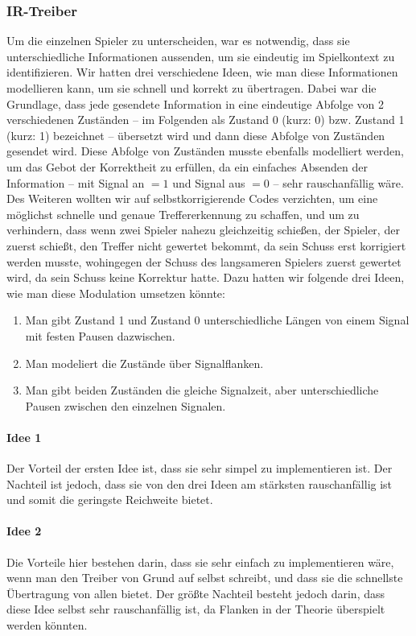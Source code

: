 \subsubsection{IR-Treiber}

Um die einzelnen Spieler zu unterscheiden, war es notwendig, dass sie unterschiedliche
Informationen aussenden, um sie eindeutig im Spielkontext zu identifizieren.
Wir hatten drei verschiedene Ideen, wie man diese Informationen modellieren kann, um sie schnell und 
korrekt zu übertragen.
Dabei war die Grundlage, dass jede gesendete Information in eine eindeutige Abfolge von 2
verschiedenen Zuständen – im Folgenden als Zustand 0 (kurz: 0) bzw. Zustand 1 (kurz: 1)
bezeichnet – übersetzt wird und dann diese Abfolge von Zuständen gesendet wird.
Diese Abfolge von Zuständen musste ebenfalls modelliert werden, um das Gebot der Korrektheit zu
erfüllen, da ein einfaches Absenden der Information – mit Signal an $= 1$ und Signal aus $= 0$ –
sehr rauschanfällig wäre.
Des Weiteren wollten wir auf selbstkorrigierende Codes verzichten, um eine möglichst schnelle und
genaue Treffererkennung zu schaffen, und um zu verhindern, dass wenn zwei Spieler nahezu
gleichzeitig schießen, der Spieler, der zuerst schießt, den Treffer nicht gewertet bekommt, da sein
Schuss erst korrigiert werden musste, wohingegen der Schuss des langsameren Spielers zuerst gewertet
wird, da sein Schuss keine Korrektur hatte.
Dazu hatten wir folgende drei Ideen, wie man diese Modulation umsetzen könnte:
\begin{enumerate}
  \item
    Man gibt Zustand 1 und Zustand 0 unterschiedliche Längen von einem Signal mit festen Pausen
    dazwischen.
  \item
	Man modeliert die Zustände über Signalflanken.
  \item
	Man gibt beiden Zuständen die gleiche Signalzeit, aber unterschiedliche Pausen zwischen den
	einzelnen Signalen.
\end{enumerate}

\paragraph{Idee 1}
Der Vorteil der ersten Idee ist, dass sie sehr simpel zu implementieren ist.
Der Nachteil ist jedoch, dass sie von den drei Ideen am stärksten rauschanfällig ist und somit die
geringste Reichweite bietet.

\paragraph{Idee 2}
Die Vorteile hier bestehen darin, dass sie sehr einfach zu implementieren wäre, wenn man den Treiber
von Grund auf selbst schreibt, und dass sie die schnellste Übertragung von allen bietet.
Der größte Nachteil besteht jedoch darin, dass diese Idee selbst sehr rauschanfällig ist, da Flanken
in der Theorie überspielt werden könnten.

